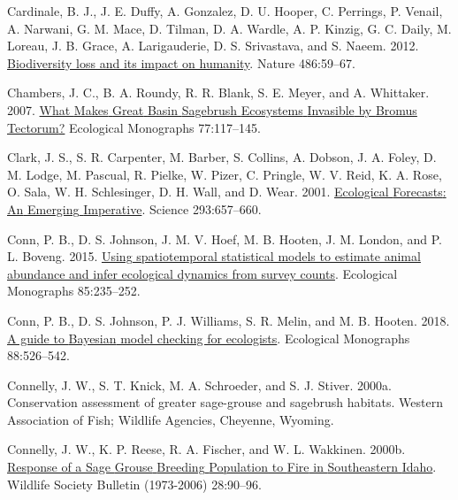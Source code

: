 \documentclass[
  12pt,
]{article}
\newlength{\cslhangindent}
\newlength{\cslentryspacingunit} %
\newenvironment{CSLReferences}[2] %
 {%
  \setlength{\parindent}{0pt}
  \ifodd #1
  \let\oldpar\par
  \def\par{\hangindent=\cslhangindent\oldpar}
  \fi
  \setlength{\parskip}{#2\cslentryspacingunit}
 }%
 {}
\begin{document}
\begin{CSLReferences}{1}{0}
\leavevmode{}%
Cardinale, B. J., J. E. Duffy, A. Gonzalez, D. U. Hooper, C. Perrings, P. Venail, A. Narwani, G. M. Mace, D. Tilman, D. A. Wardle, A. P. Kinzig, G. C. Daily, M. Loreau, J. B. Grace, A. Larigauderie, D. S. Srivastava, and S. Naeem. 2012. \href{https://doi.org/10.1038/nature11148}{Biodiversity loss and its impact on humanity}. Nature 486:59--67.

\leavevmode{}%
Chambers, J. C., B. A. Roundy, R. R. Blank, S. E. Meyer, and A. Whittaker. 2007. \href{https://doi.org/10.1890/05-1991}{What {Makes} {Great} {Basin} {Sagebrush} {Ecosystems} {Invasible} by {Bromus} {Tectorum}?} Ecological Monographs 77:117--145.

\leavevmode{}%
Clark, J. S., S. R. Carpenter, M. Barber, S. Collins, A. Dobson, J. A. Foley, D. M. Lodge, M. Pascual, R. Pielke, W. Pizer, C. Pringle, W. V. Reid, K. A. Rose, O. Sala, W. H. Schlesinger, D. H. Wall, and D. Wear. 2001. \href{https://doi.org/10.1126/science.293.5530.657}{Ecological {Forecasts}: {An} {Emerging} {Imperative}}. Science 293:657--660.

\leavevmode{}%
Conn, P. B., D. S. Johnson, J. M. V. Hoef, M. B. Hooten, J. M. London, and P. L. Boveng. 2015. \href{https://doi.org/10.1890/14-0959.1}{Using spatiotemporal statistical models to estimate animal abundance and infer ecological dynamics from survey counts}. Ecological Monographs 85:235--252.

\leavevmode{}%
Conn, P. B., D. S. Johnson, P. J. Williams, S. R. Melin, and M. B. Hooten. 2018. \href{https://doi.org/10.1002/ecm.1314}{A guide to {Bayesian} model checking for ecologists}. Ecological Monographs 88:526--542.

\leavevmode{}%
Connelly, J. W., S. T. Knick, M. A. Schroeder, and S. J. Stiver. 2000a. Conservation assessment of greater sage-grouse and sagebrush habitats. Western Association of Fish; Wildlife Agencies, Cheyenne, Wyoming.

\leavevmode{}%
Connelly, J. W., K. P. Reese, R. A. Fischer, and W. L. Wakkinen. 2000b. \href{https://www.jstor.org/stable/4617288}{Response of a {Sage} {Grouse} {Breeding} {Population} to {Fire} in {Southeastern} {Idaho}}. Wildlife Society Bulletin (1973-2006) 28:90--96.


\end{CSLReferences}
\end{document}
